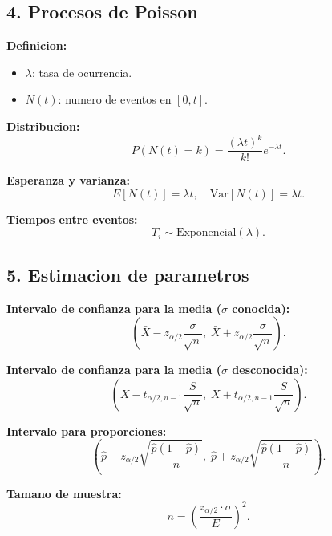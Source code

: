 \documentclass{article}
\begin{document}
\subsection{4. Procesos de Poisson}

\textbf{Definicion:}
\begin{itemize}
  \item $\lambda$: tasa de ocurrencia.
  \item $N(t)$: numero de eventos en $[0,t]$.
\end{itemize}

\textbf{Distribucion:}
\[
P(N(t) = k) = \frac{(\lambda t)^k}{k!} e^{-\lambda t}.
\]

\textbf{Esperanza y varianza:}
\[
E[N(t)] = \lambda t, \quad \text{Var}[N(t)] = \lambda t.
\]

\textbf{Tiempos entre eventos:}
\[
T_i \sim \text{Exponencial}(\lambda).
\]

\subsection{5. Estimacion de parametros}

\textbf{Intervalo de confianza para la media ($\sigma$ conocida):}
\[
\left( \bar{X} - z_{\alpha/2} \frac{\sigma}{\sqrt{n}}, \; \bar{X} + z_{\alpha/2} \frac{\sigma}{\sqrt{n}} \right).
\]

\textbf{Intervalo de confianza para la media ($\sigma$ desconocida):}
\[
\left( \bar{X} - t_{\alpha/2, n-1} \frac{S}{\sqrt{n}}, \; \bar{X} + t_{\alpha/2, n-1} \frac{S}{\sqrt{n}} \right).
\]

\textbf{Intervalo para proporciones:}
\[
\left( \hat{p} - z_{\alpha/2} \sqrt{\frac{\hat{p}(1-\hat{p})}{n}}, \; \hat{p} + z_{\alpha/2} \sqrt{\frac{\hat{p}(1-\hat{p})}{n}} \right).
\]

\textbf{Tamano de muestra:}
\[
n = \left( \frac{z_{\alpha/2} \cdot \sigma}{E} \right)^2.
\]
\end{document}
